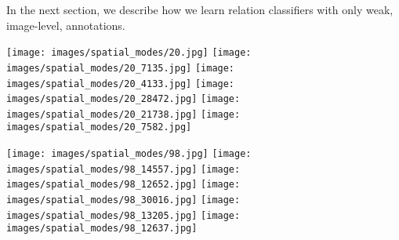 \documentclass[10pt,twocolumn,letterpaper]{article}
\newcommand{\gotoline}{\vspace{.05cm}}
\begin{document}
\gotoline
\vspace{4pt}
In the next section, we describe how we learn relation classifiers with only weak, image-level, annotations.  




\begin{figure*}[t]
\centering
    \begin{minipage}[b]{\textwidth}
       \texttt{[image: images/spatial\_modes/20.jpg]}
       \texttt{[image: images/spatial\_modes/20\_7135.jpg]}
       \texttt{[image: images/spatial\_modes/20\_4133.jpg]}
       \texttt{[image: images/spatial\_modes/20\_28472.jpg]}
       \texttt{[image: images/spatial\_modes/20\_21738.jpg]}
       \texttt{[image: images/spatial\_modes/20\_7582.jpg]}
       \vspace{-2ex}
	\end{minipage}   
	    
    \begin{minipage}[b]{\textwidth}   
       \texttt{[image: images/spatial\_modes/98.jpg]}
       \texttt{[image: images/spatial\_modes/98\_14557.jpg]}
       \texttt{[image: images/spatial\_modes/98\_12652.jpg]}
       \texttt{[image: images/spatial\_modes/98\_30016.jpg]}
       \texttt{[image: images/spatial\_modes/98\_13205.jpg]}
       \texttt{[image: images/spatial\_modes/98\_12637.jpg]}
	\vspace{-1ex}
    \end{minipage}



\end{figure*}
\end{document}
